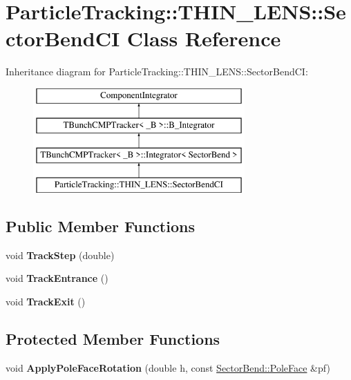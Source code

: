 \hypertarget{classParticleTracking_1_1THIN__LENS_1_1SectorBendCI}{}\section{Particle\+Tracking\+:\+:T\+H\+I\+N\+\_\+\+L\+E\+NS\+:\+:Sector\+Bend\+CI Class Reference}
\label{classParticleTracking_1_1THIN__LENS_1_1SectorBendCI}
Inheritance diagram for Particle\+Tracking\+:\+:T\+H\+I\+N\+\_\+\+L\+E\+NS\+:\+:Sector\+Bend\+CI\+:\begin{figure}[H]
\begin{center}
\leavevmode
\includegraphics[height=4.000000cm]{classParticleTracking_1_1THIN__LENS_1_1SectorBendCI}
\end{center}
\end{figure}
\subsection*{Public Member Functions}
\begin{DoxyCompactItemize}
\item 
\mbox{\label{classParticleTracking_1_1THIN__LENS_1_1SectorBendCI_a00786f03c68dd14bf13063fa3f47758d}} 
void {\bfseries Track\+Step} (double)
\item 
\mbox{\label{classParticleTracking_1_1THIN__LENS_1_1SectorBendCI_a33ef109df70873d10d4adbce49bae2e7}} 
void {\bfseries Track\+Entrance} ()
\item 
\mbox{\label{classParticleTracking_1_1THIN__LENS_1_1SectorBendCI_ad197fcc2cfae71267842e3ea17a2bccb}} 
void {\bfseries Track\+Exit} ()
\end{DoxyCompactItemize}
\subsection*{Protected Member Functions}
\begin{DoxyCompactItemize}
\item 
\mbox{\label{classParticleTracking_1_1THIN__LENS_1_1SectorBendCI_ab763573a4a4419973e2e92feb18042eb}} 
void {\bfseries Apply\+Pole\+Face\+Rotation} (double h, const \hyperlink{classSectorBend_1_1PoleFace}{Sector\+Bend\+::\+Pole\+Face} \&pf)
\end{DoxyCompactItemize}
